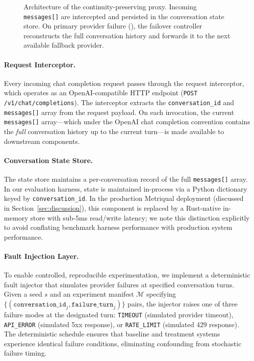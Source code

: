 \begin{figure}[t]
\caption{Architecture of the continuity-preserving proxy. Incoming \texttt{messages[]} are intercepted and persisted in the conversation state store. On primary provider failure (\textcolor{red}{\texttimes}), the failover controller reconstructs the full conversation history and forwards it to the next available fallback provider.}
\label{fig:architecture}
\end{figure}

\paragraph{Request Interceptor.}
Every incoming chat completion request passes through the request interceptor, which operates as an OpenAI-compatible HTTP endpoint (\texttt{POST /v1/chat/completions}). The interceptor extracts the \texttt{conversation\_id} and \texttt{messages[]} array from the request payload. On each invocation, the current \texttt{messages[]} array---which under the OpenAI chat completion convention contains the \textit{full} conversation history up to the current turn---is made available to downstream components.

\paragraph{Conversation State Store.}
The state store maintains a per-conversation record of the full \texttt{messages[]} array. In our evaluation harness, state is maintained in-process via a Python dictionary keyed by \texttt{conversation\_id}. In the production Metriqual deployment (discussed in Section~\ref{sec:discussion}), this component is replaced by a Rust-native in-memory store with sub-5ms read/write latency; we note this distinction explicitly to avoid conflating benchmark harness performance with production system performance.

\paragraph{Fault Injection Layer.}
To enable controlled, reproducible experimentation, we implement a deterministic fault injector that simulates provider failures at specified conversation turns. Given a seed $s$ and an experiment manifest $\mathcal{M}$ specifying $\{(\texttt{conversation\_id}_j, \texttt{failure\_turn}_j)\}$ pairs, the injector raises one of three failure modes at the designated turn: \texttt{TIMEOUT} (simulated provider timeout), \texttt{API\_ERROR} (simulated 5xx response), or \texttt{RATE\_LIMIT} (simulated 429 response). The deterministic schedule ensures that baseline and treatment systems experience identical failure conditions, eliminating confounding from stochastic failure timing.

